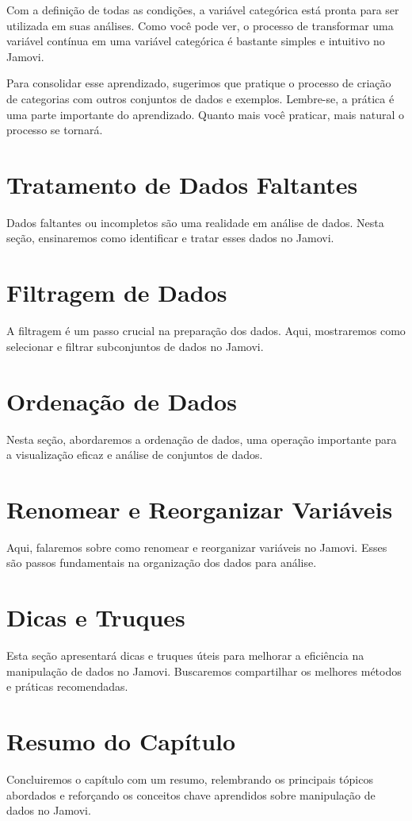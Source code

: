 Com a definição de todas as condições, a variável categórica está pronta para ser utilizada em suas análises. Como você pode ver, o processo de transformar uma variável contínua em uma variável categórica é bastante simples e intuitivo no Jamovi.

Para consolidar esse aprendizado, sugerimos que pratique o processo de criação de categorias com outros conjuntos de dados e exemplos. Lembre-se, a prática é uma parte importante do aprendizado. Quanto mais você praticar, mais natural o processo se tornará.

\section{Tratamento de Dados Faltantes}
Dados faltantes ou incompletos são uma realidade em análise de dados. Nesta seção, ensinaremos como identificar e tratar esses dados no Jamovi.

\section{Filtragem de Dados}
A filtragem é um passo crucial na preparação dos dados. Aqui, mostraremos como selecionar e filtrar subconjuntos de dados no Jamovi.

\section{Ordenação de Dados}
Nesta seção, abordaremos a ordenação de dados, uma operação importante para a visualização eficaz e análise de conjuntos de dados.

\section{Renomear e Reorganizar Variáveis}
Aqui, falaremos sobre como renomear e reorganizar variáveis no Jamovi. Esses são passos fundamentais na organização dos dados para análise.

\section{Dicas e Truques}
Esta seção apresentará dicas e truques úteis para melhorar a eficiência na manipulação de dados no Jamovi. Buscaremos compartilhar os melhores métodos e práticas recomendadas.

\section{Resumo do Capítulo}
Concluiremos o capítulo com um resumo, relembrando os principais tópicos abordados e reforçando os conceitos chave aprendidos sobre manipulação de dados no Jamovi.
